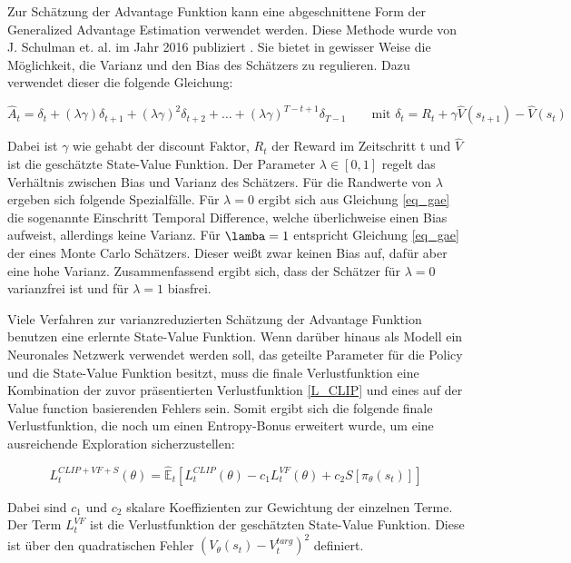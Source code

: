 Zur Schätzung der Advantage Funktion kann eine abgeschnittene Form der Generalized Advantage Estimation verwendet werden. Diese Methode wurde von J. Schulman et. al. im Jahr 2016 publiziert \cite{GAE}. Sie bietet in gewisser Weise die Möglichkeit, die Varianz und den Bias des Schätzers zu regulieren. Dazu verwendet dieser die folgende Gleichung:

\begin{equation}
  \hat{A}_t = \delta_t + (\lambda \gamma) \delta_{t+1} + (\lambda \gamma)^2 \delta_{t+2} + \dots + (\lambda \gamma)^{T-t+1} \delta_{T-1} \qquad \text{mit } \delta_t = R_t + \gamma \hat{V}(s_{t+1}) - \hat{V}(s_t)
  \label{eq_gae}
\end{equation}

Dabei ist $\gamma$ wie gehabt der discount Faktor, $R_t$ der Reward im Zeitschritt t und $\hat{V}$ ist die geschätzte State-Value Funktion. Der Parameter $\lambda \in [0, 1]$ regelt das Verhältnis zwischen Bias und Varianz des Schätzers. Für die Randwerte von $\lambda$ ergeben sich folgende Spezialfälle. Für $\lambda = 0$ ergibt sich aus Gleichung \ref{eq_gae} die sogenannte Einschritt Temporal Difference, welche überlichweise einen Bias aufweist, allerdings keine Varianz. Für $\lamba = 1$ entspricht Gleichung \ref{eq_gae} der eines Monte Carlo Schätzers. Dieser weißt zwar keinen Bias auf, dafür aber eine hohe Varianz. Zusammenfassend ergibt sich, dass der Schätzer für $\lambda = 0$ varianzfrei ist und für $\lambda = 1$ biasfrei.

Viele Verfahren zur varianzreduzierten Schätzung der Advantage Funktion benutzen eine erlernte State-Value Funktion. Wenn darüber hinaus als Modell ein Neuronales Netzwerk verwendet werden soll, das geteilte Parameter für die Policy und die State-Value Funktion besitzt, muss die finale Verlustfunktion eine Kombination der zuvor präsentierten Verlustfunktion \eqref{L_CLIP} und eines auf der Value function basierenden Fehlers sein. Somit ergibt sich die folgende finale Verlustfunktion, die noch um einen Entropy-Bonus erweitert wurde, um eine ausreichende Exploration sicherzustellen:

\begin{equation}
	L_t^{CLIP+VF+S}(\theta) = \hat{\mathbb{E}}_t[L_t^{CLIP}(\theta) - c_1 L_t^{VF}(\theta) + c_2 S[\pi_\theta(s_t)]]
  \label{L_gesamt}
\end{equation}

Dabei sind $c_1$ und $c_2$ skalare Koeffizienten zur Gewichtung der einzelnen Terme. Der Term $L_t^{VF}$ ist die Verlustfunktion der geschätzten State-Value Funktion. Diese ist über den quadratischen Fehler $(V_\theta(s_t) - V_t^{targ})^2$ definiert.

